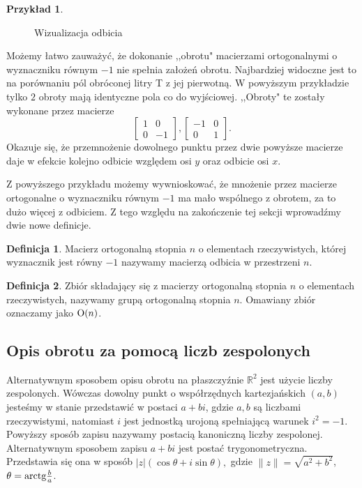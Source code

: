 \documentclass[a4paper,twoside,11pt,reqno]{mwrep}
\theoremstyle{plain} \newtheorem{twr}{Twierdzenie}
\theoremstyle{plain} \newtheorem{lem}{Lemat}
\theoremstyle{definition} \newtheorem{defi}{Definicja}
\theoremstyle{remark} \newtheorem*{wni}{Wniosek}
\theoremstyle{definition} \newtheorem{uwaga}{Uwaga}
\theoremstyle{definition}\newtheorem{prz}{Przykład}
\begin{document}
\begin{prz}
\begin{figure}[h]
\begin{center}
\caption{Wizualizacja odbicia}
\end{center}
\end{figure}
Możemy łatwo zauważyć, że dokonanie ,,obrotu" macierzami 
ortogonalnymi o wyznaczniku równym $-1$ nie spełnia założeń obrotu. Najbardziej widoczne
jest to na porównaniu pól obróconej litry T z jej pierwotną. W powyższym przykładzie tylko 
$2$ obroty mają identyczne pola co do wyjściowej. ,,Obroty" te zostały wykonane przez macierze
$$
\begin{bmatrix}
1&0 \\
0 & -1
\end{bmatrix},
\begin{bmatrix}
-1&0 \\
0 & 1
\end{bmatrix}.$$
Okazuje się, że przemnożenie dowolnego punktu przez dwie powyższe macierze daje w efekcie kolejno
odbicie względem osi $y$ oraz odbicie osi $x$.
\end{prz}
Z powyższego przykładu możemy wywnioskować, że mnożenie przez macierze ortogonalne 
o wyznaczniku równym $-1$ ma mało wspólnego z obrotem, za to dużo więcej z odbiciem. Z tego 
względu na zakończenie tej sekcji wprowadźmy dwie nowe definicje. 
\begin{defi}
Macierz ortogonalną stopnia $n$ o elementach rzeczywistych, której wyznacznik jest równy $-1$ 
nazywamy macierzą odbicia w przestrzeni $n$. 
\end{defi}
\begin{defi}
Zbiór składający się z macierzy ortogonalną stopnia $n$ o elementach rzeczywistych, nazywamy grupą
ortogonalną stopnia $n$. Omawiany zbiór oznaczamy jako $\textup{O}(n)$.
\end{defi}


\subsection{Opis obrotu za pomocą liczb zespolonych}
Alternatywnym sposobem opisu obrotu na płaszczyźnie $\mathbb{R}^2$
jest użycie liczby zespolonych. Wówczas dowolny punkt o współrzędnych kartezjańskich $(a,b)$
jesteśmy w stanie przedstawić w postaci $a+bi$, gdzie $a,b$ są liczbami rzeczywistymi, natomiast 
$i$ jest jednostką urojoną spełniającą warunek $i^2 = -1$. Powyższy sposób zapisu nazywamy 
postacią kanoniczną liczby zespolonej.\\
Alternatywnym sposobem zapisu $a+bi$ jest postać trygonometryczna. Przedstawia się ona w sposób
$|z|(\cos\theta+i\sin\theta),$
gdzie $\|z\| =\sqrt{a^2+b^2}$, $\theta=\textup{arctg}\frac{b}{a}$.\\
\end{document}
